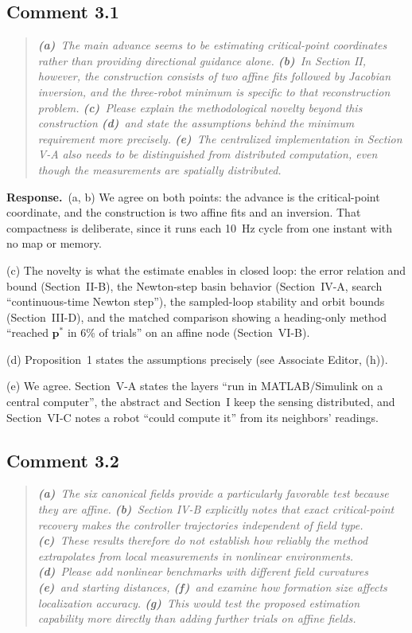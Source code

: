 \documentclass[10pt]{article}
\newcommand{\rev}[1]{#1}                             %
\newcommand{\resp}{\par\textbf{Response.}~}
\begin{document}
\subsection*{Comment 3.1}

\begin{quote}\itshape
\textbf{(a)}~The main advance seems to be estimating critical-point coordinates rather than providing directional guidance alone.
\textbf{(b)}~In Section II, however, the construction consists of two affine fits followed by Jacobian inversion, and the three-robot minimum is specific to that reconstruction problem.
\textbf{(c)}~Please explain the methodological novelty beyond this construction
\textbf{(d)}~and state the assumptions behind the minimum requirement more precisely.
\textbf{(e)}~The centralized implementation in Section V-A also needs to be distinguished from distributed computation, even though the measurements are spatially distributed.
\end{quote}

\resp (a, b) We agree on both points: the advance is the critical-point coordinate, and the construction is two affine fits and an inversion. That compactness is deliberate, since it runs each 10~Hz cycle from one instant with no map or memory.

(c) The novelty is what the estimate enables in closed loop: the error relation and bound (Section~II-B), the Newton-step basin behavior (Section~IV-A, search ``continuous-time Newton step''), the sampled-loop stability and orbit bounds (Section~III-D), and the matched comparison showing a heading-only method ``reached $\mathbf{p}^*$ in \rev{6}\% of trials'' on an affine node (Section~VI-B).

(d) Proposition~1 states the assumptions precisely (see Associate Editor, (h)).

(e) We agree. Section~V-A states the layers ``run in MATLAB/Simulink on a central computer'', the abstract and Section~I keep the sensing distributed, and Section~VI-C notes a robot ``could compute it'' from its neighbors' readings.

\subsection*{Comment 3.2}

\begin{quote}\itshape
\textbf{(a)}~The six canonical fields provide a particularly favorable test because they are affine.
\textbf{(b)}~Section IV-B explicitly notes that exact critical-point recovery makes the controller trajectories independent of field type.
\textbf{(c)}~These results therefore do not establish how reliably the method extrapolates from local measurements in nonlinear environments.
\textbf{(d)}~Please add nonlinear benchmarks with different field curvatures
\textbf{(e)}~and starting distances,
\textbf{(f)}~and examine how formation size affects localization accuracy.
\textbf{(g)}~This would test the proposed estimation capability more directly than adding further trials on affine fields.
\end{quote}
\end{document}
